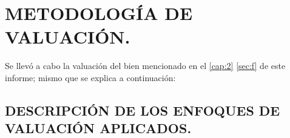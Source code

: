 	
\chapter{METODOLOG\'IA DE VALUACI\'ON.}\label{cap:4}
\thispagestyle{fancy}

Se llev\'o a cabo la valuaci\'on del bien mencionado en el \autoref{cap:2}  \autoref{sec:f} de este informe; mismo que se explica a continuaci\'on:

\setcounter{section}{10}
\section{DESCRIPCI\'ON DE LOS ENFOQUES DE VALUACI\'ON APLICADOS.}\label{sec:k}

\renewcommand\thefigure{\arabic{figure}} 


